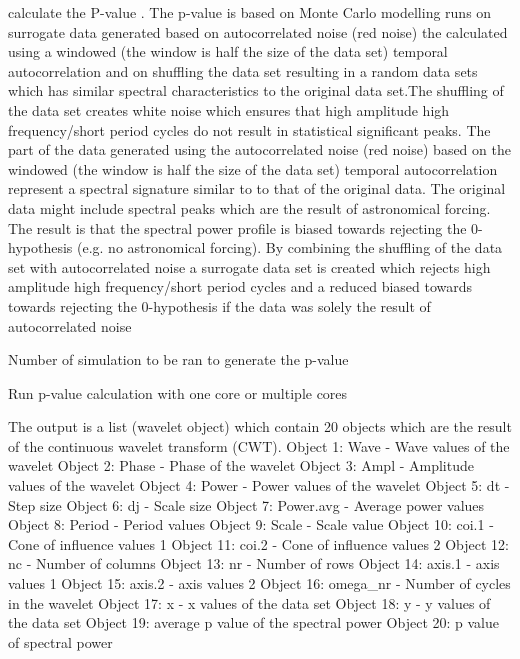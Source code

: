 \documentclass[a4paper]{book}
\begin{document}
\begin{Arguments}
\begin{ldescription}
\item[\code{pval}] calculate the P-value  . The p-value is based on
Monte Carlo modelling runs on surrogate data generated based on autocorrelated noise (red noise) the calculated using a windowed
(the window is half the size of the data set) temporal autocorrelation
and on shuffling the data set resulting in a random data sets which has similar spectral characteristics
to the original data set.The shuffling of the data set creates white noise which ensures that high amplitude high frequency/short
period cycles do not result in statistical significant peaks. The part of the data generated using the  autocorrelated noise (red noise)
based on the windowed  (the window is half the size of the data set) temporal autocorrelation represent a spectral signature similar to
to that of the original data. The original data might include spectral peaks which are the result of astronomical
forcing. The result is that the spectral power profile is biased towards rejecting the 0-hypothesis (e.g. no astronomical forcing).
By combining the shuffling of the data set with autocorrelated noise a surrogate data set is created which rejects
high amplitude high frequency/short period cycles and a reduced biased towards towards rejecting the 0-hypothesis if the data was
solely the result of autocorrelated noise

\item[\code{n\_simulations}] Number of simulation to be ran to generate the p-value

\item[\code{run\_multicore}] Run p-value calculation with one core or multiple cores
\end{ldescription}
\end{Arguments}
%
\begin{Value}
The output is a list (wavelet object) which contain 20 objects which are the result of the continuous wavelet transform (CWT).
Object 1: Wave - Wave values of the wavelet
Object 2: Phase - Phase of the wavelet
Object 3: Ampl - Amplitude values of the wavelet
Object 4: Power - Power values of the wavelet
Object 5: dt - Step size
Object 6: dj - Scale size
Object 7: Power.avg  - Average power values
Object 8: Period - Period values
Object 9: Scale - Scale value
Object 10: coi.1 - Cone of influence values 1
Object 11: coi.2 - Cone of influence values 2
Object 12: nc - Number of columns
Object 13: nr - Number of rows
Object 14: axis.1 - axis values 1
Object 15: axis.2 - axis values 2
Object 16: omega\_nr - Number of cycles in the wavelet
Object 17: x - x values of the data set
Object 18: y - y values of the data set
Object 19: average p value of the spectral power
Object 20: p value of spectral power
\end{Value}
\end{document}
